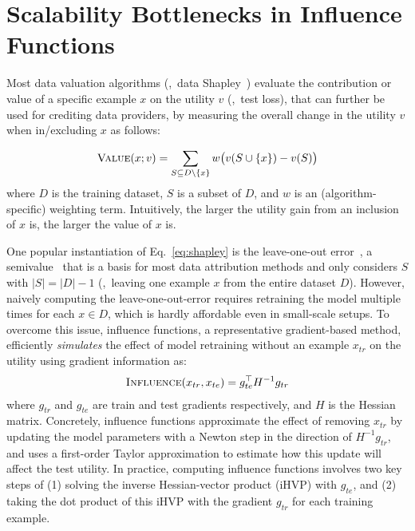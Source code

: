 \section{Scalability Bottlenecks in Influence Functions}
\label{sec:background}
Most data valuation algorithms (\eg,\ data Shapley~\cite{ghorbani2019data}) evaluate the contribution or value of a specific example $x$ on the utility $v$ (\eg,\ test loss), that can further be used for crediting data providers, by measuring the overall change in the utility $v$ when in/excluding $x$ as follows:

\begin{align}
    \textsc{Value}(x;v) = \sum_{S\subseteq D\backslash \{x\}}w\big(v(S\cup\{x\}) - v(S)\big)\label{eq:shapley}
\end{align}
where $D$ is the training dataset,
$S$ is a subset of $D$, and $w$ is an (algorithm-specific) weighting term. Intuitively, the larger the utility gain from an inclusion of $x$ is, the larger the value of $x$ is.

One popular instantiation of Eq.~\eqref{eq:shapley} is the leave-one-out error~\cite{koh2017understanding}, a semivalue~\cite{dubey1981value} that is a basis for most data attribution methods and only considers $S$ with $|S|=|D|-1$ (\ie,\ leaving one example $x$ from the entire dataset $D$).
However, naively computing the leave-one-out-error requires retraining the model multiple times for each $x\in D$, which is hardly affordable even in small-scale setups.
To overcome this issue, influence functions, a representative gradient-based method, efficiently \textit{simulates} the effect of model retraining without an example $x_{tr}$ on the utility using gradient information as:
\begin{align}
    \textsc{Influence}(x_{tr}, x_{te}) = g_{te}^\top H^{-1}g_{tr}\label{eq:if}
\end{align}
where $g_{tr}$ and $g_{te}$ are train and test gradients respectively, and $H$ is the Hessian matrix. Concretely, influence functions approximate the effect of removing $x_{tr}$ by updating the model parameters with a Newton step in the direction of $H^{-1}g_{tr}$, and uses a first-order Taylor approximation to estimate how this update will affect the test utility. In practice, computing influence functions involves two key steps of (1) solving the inverse Hessian-vector product (iHVP) with $g_{te}$, and (2) taking the dot product of this iHVP with the gradient $g_{tr}$ for each training example.

